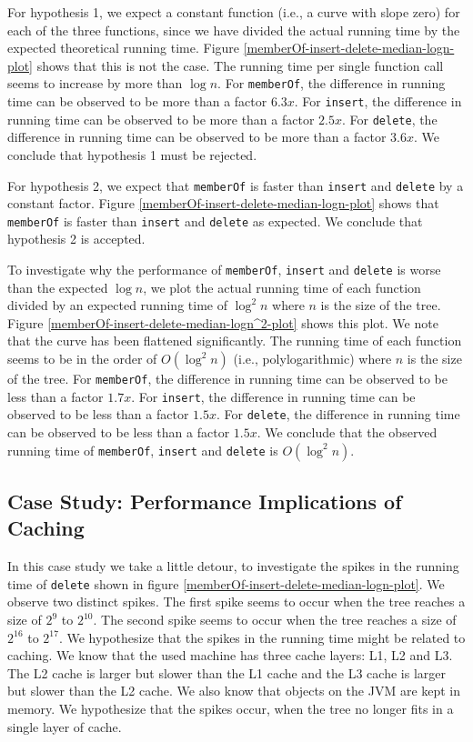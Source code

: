 \documentclass[../main.tex]{subfiles}
\begin{document}
For hypothesis 1, we expect a constant function (i.e., a curve with slope zero) for each of the three functions, since we have divided the actual running time by the expected theoretical running time. Figure \ref{memberOf-insert-delete-median-logn-plot} shows that this is not the case. The running time per single function call seems to increase by more than $\log{n}$. For \lstinline{memberOf}, the difference in running time can be observed to be more than a factor $6.3x$. For \lstinline{insert}, the difference in running time can be observed to be more than a factor $2.5x$. For \lstinline{delete}, the difference in running time can be observed to be more than a factor $3.6x$. We conclude that hypothesis 1 must be rejected.

For hypothesis 2, we expect that \lstinline{memberOf} is faster than \lstinline{insert} and \lstinline{delete} by a constant factor. Figure \ref{memberOf-insert-delete-median-logn-plot} shows that \lstinline{memberOf} is faster than \lstinline{insert} and \lstinline{delete} as expected. We conclude that hypothesis 2 is accepted.

To investigate why the performance of \lstinline{memberOf}, \lstinline{insert} and \lstinline{delete} is worse than the expected $\log{n}$, we plot the actual running time of each function divided by an expected running time of $\log^2{n}$ where $n$ is the size of the tree. Figure \ref{memberOf-insert-delete-median-logn^2-plot} shows this plot. We note that the curve has been flattened significantly. The running time of each function seems to be in the order of $O(\log^2{n})$ (i.e., polylogarithmic) where $n$ is the size of the tree. For \lstinline{memberOf}, the difference in running time can be observed to be less than a factor $1.7x$. For \lstinline{insert}, the difference in running time can be observed to be less than a factor $1.5x$. For \lstinline{delete}, the difference in running time can be observed to be less than a factor $1.5x$. We conclude that the observed running time of \lstinline{memberOf}, \lstinline{insert} and \lstinline{delete} is $O(\log^2{n})$.

\subsection{Case Study: Performance Implications of Caching}

In this case study we take a little detour, to investigate the spikes in the running time of \lstinline{delete} shown in figure \ref{memberOf-insert-delete-median-logn-plot}. We observe two distinct spikes. The first spike seems to occur when the tree reaches a size of $2^9$ to $2^{10}$. The second spike seems to occur when the tree reaches a size of $2^{16}$ to $2^{17}$. We hypothesize that the spikes in the running time might be related to caching. We know that the used machine has three cache layers: L1, L2 and L3. The L2 cache is larger but slower than the L1 cache and the L3 cache is larger but slower than the L2 cache. We also know that objects on the JVM are kept in memory. We hypothesize that the spikes occur, when the tree no longer fits in a single layer of cache. 
\end{document}
